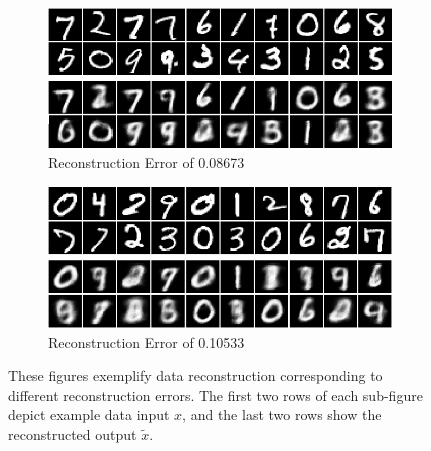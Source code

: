 \documentclass[honours,12pt]{unswthesis}
\numberwithin{equation}{section}
\theoremstyle{definition}
\begin{document}
\begin{figure}[h!]
\begin{subfigure}{\textwidth}
\centering
\includegraphics[width=0.9\linewidth]{086729.png}
\caption{Reconstruction Error of 0.08673}
\end{subfigure}
\begin{subfigure}{\textwidth}
\centering
\includegraphics[width=0.9\linewidth]{105329.png}
\caption{Reconstruction Error of 0.10533}
\end{subfigure}
\caption{\small These figures exemplify data reconstruction corresponding to different reconstruction errors. The first two rows of each sub-figure depict example data input $x$, and the last two rows show the reconstructed output $\tilde{x}$.}
\end{figure}
\end{document}
